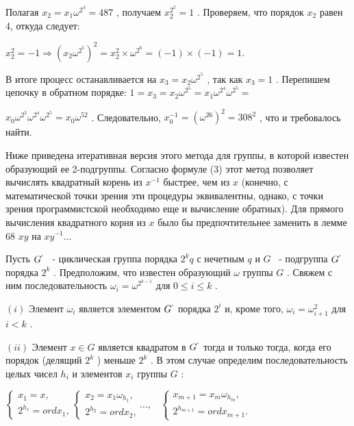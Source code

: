 Полагая $x_2=x_1\omega^{2^4}=487$
, получаем $x_2^{2^2}=1$
. Проверяем, что порядок $x_2$
 равен 4, откуда следует:

\begin{center}
$x_2^2 = -1\Rightarrow (x_2\omega^{2^5})^2 = x_2^2\times\omega^{2^6}=(-1)\times(-1)=1$.
\end{center}


В итоге процесс останавливается на $x_3=x_2\omega^{2^5}$
, так как $x_3=1$
. Перепишем цепочку в обратном порядке: $1=x_3=x_2\omega^{2^5}=x_1\omega^{2^4}\omega^{2^5}=$


\newpage

$x_0\omega^{2^2}\omega^{2^4}\omega^{2^5}=x_0\omega^52$
. Следовательно, $x_0^{-1}=(\omega^26)^2=308^2$
, что и требовалось найти.

Ниже приведена итеративная версия этого метода для группы, в которой известен образующий ее 2-подгруппы. Согласно формуле (3) этот метод позволяет вычислять квадратный корень из $x^{-1}$
 быстрее, чем из $x$
 (конечно, с математической точки зрения эти процедуры эквивалентны, однако, с точки зрения программистской необходимо еще и вычисление обратных). Для прямого вычисления квадратного корня из $x$
 было бы предпочтительнее заменить в лемме 68 $xy$
 на $xy^{-1}\dots$

\begin{predl}
Пусть $G^`$
 ~- циклическая группа порядка $2^kq$
 с нечетным $q$
 и $G$
 ~- подгруппа $G^`$
 порядка $2^k$
 . Предположим, что известен образующий $\omega$
 группы $G$
 . Свяжем с ним последовательность $\omega_i=\omega^{2^{k-1}}$
 для $0\leqslant i\leqslant k$
 .

$(i)$ Элемент $\omega_i$
 является элементом $G^`$
 порядка $2^i$
 и, кроме того, $\omega_i = \omega^2_{i+1}$
 для $i<k$
 .

$(ii)$ Элемент $x\in G$
 является квадратом в $G^`$
 тогда и только тогда, когда его порядок (делящий $2^k$
    ) меньше $2^k$
 . В этом случае определим последовательность целых чисел $h_i$
 и элементов $x_i$
 группы $G$
 :
\end{predl}
\begin{center}
$
    \begin{cases}
    \text{$x_1=x$,} \\
    \text{$2^{h_1}=ordx_1$,}
    \end{cases}
    \begin{cases}
    \text{$x_2=x_1\omega_{h_1}$,} \\
    \text{$2^{h_2}=ordx_2$,}
    \end{cases}
    \dots, \ \ \ \
    \begin{cases}
    \text{$x_{m+1}=x_m\omega_{h_m}$,} \\
    \text{$2^{h_{m+1}}=ordx_{m+1}$.}
    \end{cases}
$
\end{center}



